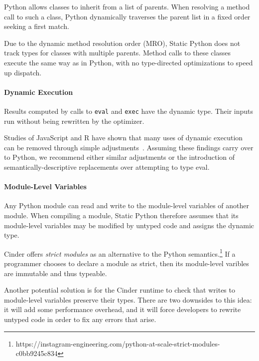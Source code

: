 \documentclass[english,cleveref,submission]{programming}
\newcommand{\SP}{Static Python}
\newcommand{\code}[1]{\texttt{#1}}
\begin{document}
Python allows classes to inherit from a list of parents.
When resolving a method call to such a class, Python
dynamically traverses the parent list in a fixed order
seeking a first match.

Due to the dynamic method resolution order (MRO),
\SP{} does not track types for classes with multiple parents.
Method calls to these classes execute the same way as
in Python, with no type-directed optimizations to speed up dispatch.


\paragraph{Dynamic Execution}
Results computed by calls to \code{eval} and \code{exec}
have the dynamic type.
Their inputs run without being rewritten
by the optimizer.

Studies of JavaScript and R have shown that many uses of dynamic execution
can be removed through simple adjustments~\cite{rhbv-ecoop-2011,gdkkv-oopsla-2021,mrmv-esop-2012}.
Assuming these findings carry over to Python, we recommend either similar
adjustments or the introduction of semantically-descriptive replacements
over attempting to type eval.


\paragraph{Module-Level Variables}

Any Python module can read and write to the module-level variables of another module.
When compiling a module, \SP{} therefore assumes that its module-level variables
may be modified by untyped code and assigns the dynamic type.

Cinder offers \emph{strict modules} as an alternative to the Python
semantics.\footnote{https://instagram-engineering.com/python-at-scale-strict-modules-c0bb9245c834}
If a programmer chooses to declare a module as strict, then its module-level varibles
are immutable and thus typeable.

Another potential solution is for the Cinder runtime to check that writes to module-level variables
preserve their types.
There are two downsides to this idea:
it will add some performance overhead,
and it will force developers to rewrite untyped code in order to fix any errors that arise.
\end{document}
